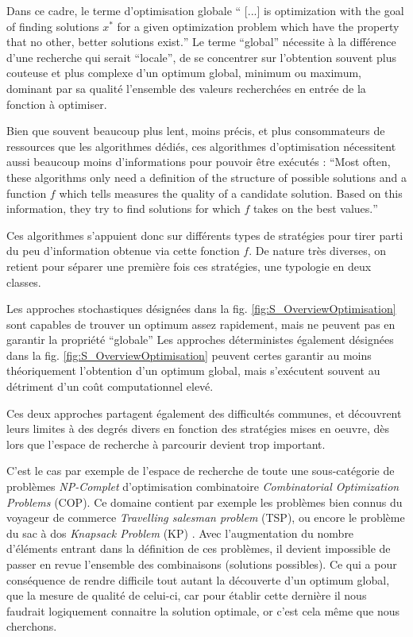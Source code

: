 Dans ce cadre, le terme d'optimisation globale \foreignquote{english}{ [...] is optimization with the goal of finding solutions $x^*$ for a given optimization problem which have the property that no other, better solutions exist.} Le terme \enquote{global} nécessite à la différence d'une recherche qui serait \enquote{locale}, de se concentrer sur l'obtention souvent plus couteuse et plus complexe d'un optimum global, minimum ou maximum, dominant par sa qualité l'ensemble des valeurs recherchées en entrée de la fonction à optimiser.

Bien que souvent beaucoup plus lent, moins précis, et plus consommateurs de ressources que les algorithmes dédiés, ces algorithmes d'optimisation nécessitent aussi beaucoup moins d'informations pour pouvoir être exécutés : \foreignquote{english}{Most often, these algorithms only need a definition of the structure of possible solutions and a function $f$ which tells measures the quality of a candidate solution. Based on this information, they try to find solutions for which $f$ takes on the best values.} \autocite[24]{Weise2011}

Ces algorithmes s'appuient donc sur différents types de stratégies pour tirer parti du peu d'information obtenue via cette fonction $f$. De nature très diverses, on retient pour séparer une première fois ces stratégies, une typologie en deux classes.

\begin{itemize}[label=\textbullet]
 Les approches stochastiques désignées dans la fig. \ref{fig:S_OverviewOptimisation} sont capables de trouver un optimum assez rapidement, mais ne peuvent pas en garantir la propriété \enquote{globale}
 Les approches déterministes également désignées dans la fig. \ref{fig:S_OverviewOptimisation} peuvent certes garantir au moins théoriquement l'obtention d'un optimum global, mais s'exécutent souvent au détriment d'un coût computationnel elevé.
\end{itemize}

Ces deux approches partagent également des difficultés communes, et découvrent leurs limites à des degrés divers en fonction des stratégies mises en oeuvre, dès lors que l'espace de recherche à parcourir devient trop important.

C'est le cas par exemple de l'espace de recherche de toute une sous-catégorie de problèmes \textit{NP-Complet}  d'optimisation combinatoire \textit{Combinatorial Optimization Problems} (COP). Ce domaine contient par exemple les problèmes bien connus du voyageur de commerce \textit{Travelling salesman problem} (TSP), ou encore le problème du sac à dos \textit{Knapsack Problem} (KP) . Avec l'augmentation du nombre d'éléments entrant dans la définition de ces problèmes, il devient impossible de passer en revue l'ensemble des combinaisons (solutions possibles). Ce qui a pour conséquence de rendre difficile tout autant la découverte d'un optimum global, que la mesure de qualité de celui-ci, car pour établir cette dernière il nous faudrait logiquement connaitre la solution optimale, or c'est cela même que nous cherchons.

